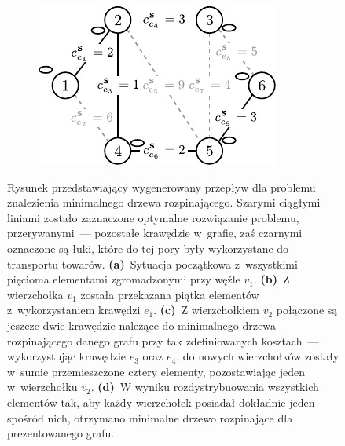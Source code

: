 \begin{figure}[!htbp]
\begin{subfigure}[b]{0.242\textwidth}
		\caption{}
		\label{fig:mst2Example:c}
	\end{subfigure}
	\hfill
	\begin{subfigure}[b]{0.242\textwidth}
		\includegraphics[width=\textwidth]{Chapter_III/MST2-example/d}
		\caption{}
		\label{fig:mst2Example:d}
	\end{subfigure}
	\hfill\null
	\caption{
		Rysunek przedstawiający wygenerowany przepływ dla problemu znalezienia minimalnego drzewa rozpinającego.
		Szarymi ciągłymi liniami zostało zaznaczone optymalne rozwiązanie problemu, przerywanymi~--- pozostałe krawędzie w~grafie, zaś czarnymi oznaczone są łuki, które do tej pory były wykorzystane do transportu towarów.
		\textbf{(a)}~Sytuacja początkowa z~wszystkimi pięcioma elementami zgromadzonymi przy węźle $v_{1}$.
		\textbf{(b)}~Z wierzchołka $v_{1}$ została przekazana piątka elementów z~wykorzystaniem krawędzi $e_{1}$.
		\textbf{(c)}~Z wierzchołkiem $v_{2}$ połączone są jeszcze dwie krawędzie należące do minimalnego drzewa rozpinającego danego grafu przy tak zdefiniowanych kosztach~--- wykorzystując krawędzie $e_{3}$ oraz $e_{4}$, do nowych wierzchołków zostały w~sumie przemieszczone cztery elementy, pozostawiając jeden w~wierzchołku $v_{2}$.
		\textbf{(d)}~W wyniku rozdystrybuowania wszystkich elementów tak, aby każdy wierzchołek posiadał dokładnie jeden spośród nich, otrzymano minimalne drzewo rozpinające dla prezentowanego grafu. 
	}
	\label{fig:mst2Example}
\end{figure}

